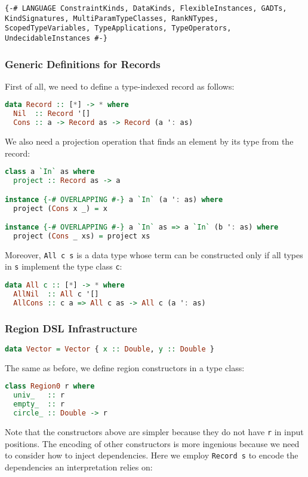 \begin{lstlisting}
{-# LANGUAGE ConstraintKinds, DataKinds, FlexibleInstances, GADTs, KindSignatures, MultiParamTypeClasses, RankNTypes, ScopedTypeVariables, TypeApplications, TypeOperators, UndecidableInstances #-}
\end{lstlisting}

\subsubsection{Generic Definitions for Records}

First of all, we need to define a type-indexed record as follows:

\begin{lstlisting}[language=Haskell]
data Record :: [*] -> * where
  Nil  :: Record '[]
  Cons :: a -> Record as -> Record (a ': as)
\end{lstlisting}
\noindent
We also need a projection operation that finds an element by its type
from the record:

\begin{lstlisting}[language=Haskell]
class a `In` as where
  project :: Record as -> a

instance {-# OVERLAPPING #-} a `In` (a ': as) where
  project (Cons x _) = x

instance {-# OVERLAPPING #-} a `In` as => a `In` (b ': as) where
  project (Cons _ xs) = project xs
\end{lstlisting}
\noindent
Moreover, \lstinline!All c s! is a data type whose term
can be constructed only if all types in \lstinline!s!
implement the type class \lstinline!c!:

\begin{lstlisting}[language=Haskell]
data All c :: [*] -> * where
  AllNil  :: All c '[]
  AllCons :: c a => All c as -> All c (a ': as)
\end{lstlisting}

\subsubsection{Region DSL Infrastructure}

\begin{lstlisting}[language=Haskell]
data Vector = Vector { x :: Double, y :: Double }
\end{lstlisting}
\noindent
The same as before, we define region constructors in a type class:

\begin{lstlisting}[language=Haskell]
class Region0 r where
  univ_   :: r
  empty_  :: r
  circle_ :: Double -> r
\end{lstlisting}
\noindent
Note that the constructors above are simpler because they do not have
\lstinline!r! in input positions. The encoding of other
constructors is more ingenious because we need to consider how to inject
dependencies. Here we employ \lstinline!Record s! to
encode the dependencies an interpretation relies on:

